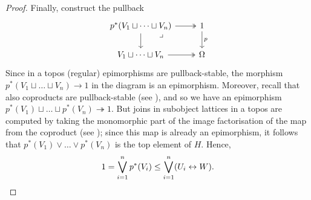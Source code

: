 \documentclass[12pt]{amsart}
\theoremstyle{plain}
\theoremstyle{definition}
\begin{document}
\begin{proof}
    Finally, construct the pullback
    \[
        \begin{tikzcd}
        	{p^*(V_1 \sqcup \dots \sqcup V_n)} \arrow[dr, phantom, very near start, "\lrcorner"] & 1 \\
        	{V_1\sqcup\dots\sqcup V_n} & \Omega
        	\arrow[two heads, from=1-1, to=1-2]
        	\arrow[from=1-1, to=2-1]
        	\arrow["p"', swap, from=1-2, to=2-2]
        	\arrow[two heads, from=2-1, to=2-2]
        \end{tikzcd}
    \]
    Since in a topos (regular) epimorphisms are pullback-stable, the morphism $p^*(V_1\sqcup\dots\sqcup V_n)\to 1$ in the diagram is an epimorphism. Moreover, recall that also coproducts are pullback-stable (see \cite[Lem.~1.51]{johnstonetopos}), and so we have an epimorphism $p^*(V_1)\sqcup \dots\sqcup  p^*(V_n)\twoheadrightarrow 1$. But joins in subobject lattices in a topos are computed by taking the monomorphic part of the image factorisation of the map from the coproduct (see \cite[p.~31]{johnstone2002sketches}); since this map is already an epimorphism, it follows that $p^*(V_1)\vee\dots \vee p^*(V_n)$ is the top element of $H$.  Hence, 
    \[
        1 = \bigvee_{i=1}^{n} p^*(V_i) \leq \bigvee_{i=1}^{n} (U_i\leftrightarrow W). \qedhere
    \]
\end{proof}
\end{document}
